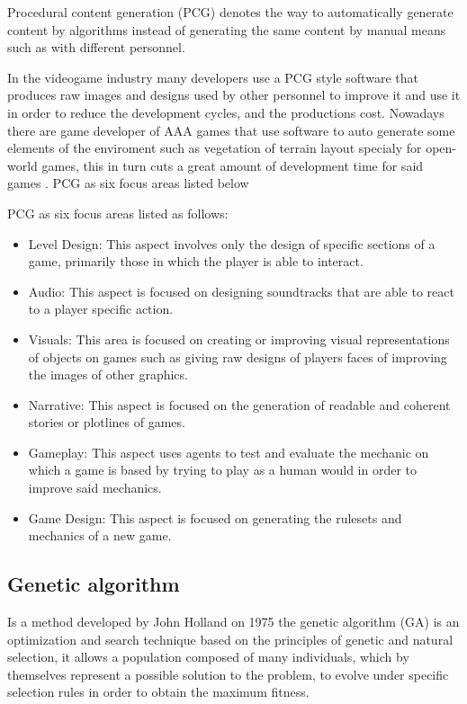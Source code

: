 \documentclass[graybox]{svmult}
\begin{document}
Procedural content generation (PCG) denotes the way to automatically generate content by algorithms instead of generating the same content by manual means such as with different personnel.

In the videogame industry many developers use a PCG style software that produces raw images and designs used by other personnel to improve it and use it in order to reduce the development cycles, and the productions cost. \cite{togelius2016introduction}
Nowadays there are game developer of AAA games that use software to auto generate some elements of the enviroment such as vegetation of terrain layout specialy for open-world games, this in turn cuts a great amount of development time for said games \cite{TogeliusTaxonomy,Smith2012}.
PCG as six focus areas listed below

PCG as six focus areas listed as follows:

\begin{itemize}
    \item Level Design: This aspect involves only the design of specific sections of a game, primarily those in which the player is able to interact.
    \item Audio: This aspect is focused on designing soundtracks that are able to react to a player specific action.
    \item Visuals: This area is focused on creating or improving visual representations of objects on games such as giving raw designs of players faces of improving the images of other graphics.
    \item Narrative: This aspect is focused on the generation of readable and coherent stories or plotlines of games.
    \item Gameplay: This aspect uses agents to test and evaluate the mechanic on which a game is based by trying to play as a human would in order to improve said mechanics.
    \item Game Design: This aspect is focused on generating the rulesets and mechanics of a new game. \cite{Yannakakis2017,Smith2014,shaker2016procedural}
\end{itemize}

\subsection{Genetic algorithm}

Is a method developed by John Holland on 1975 \cite{Holland1975} the genetic algorithm (GA) is an optimization and search technique based on the principles of genetic and natural selection, it allows a population composed of many individuals, which by themselves represent a possible solution to the problem, to evolve under specific selection rules in order to obtain the maximum fitness.
\end{document}
